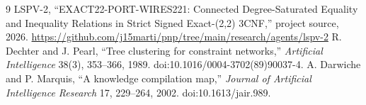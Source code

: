 \documentclass[11pt]{article}
\begin{document}
\begin{thebibliography}{9}
 LSPV-2, ``EXACT22-PORT-WIRES221: Connected Degree-Saturated Equality and Inequality Relations in Strict Signed Exact-(2,2) 3CNF,'' project source, 2026. \url{https://github.com/j15marti/pnp/tree/main/research/agents/lspv-2}
 R. Dechter and J. Pearl, ``Tree clustering for constraint networks,'' \emph{Artificial Intelligence} 38(3), 353--366, 1989. doi:10.1016/0004-3702(89)90037-4.
 A. Darwiche and P. Marquis, ``A knowledge compilation map,'' \emph{Journal of Artificial Intelligence Research} 17, 229--264, 2002. doi:10.1613/jair.989.
\end{thebibliography}
\end{document}
